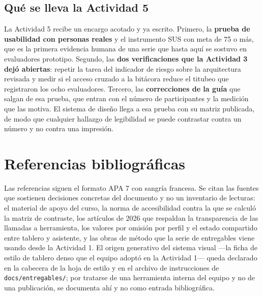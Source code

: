 \subsection{Qué se lleva la Actividad 5}

La Actividad 5 recibe un encargo acotado y ya escrito. Primero, la \textbf{prueba de usabilidad con personas reales} y el instrumento SUS con meta de 75 o más, que es la primera evidencia humana de una serie que hasta aquí se sostuvo en evaluadores prototipo. Segundo, las \textbf{dos verificaciones que la Actividad 3 dejó abiertas}: repetir la tarea del indicador de riesgo sobre la arquitectura revisada y medir si el acceso cruzado a la bitácora reduce el titubeo que registraron los ocho evaluadores. Tercero, las \textbf{correcciones de la guía} que salgan de esa prueba, que entran con el número de participantes y la medición que las motiva. El sistema de diseño llega a esa prueba con su matriz publicada, de modo que cualquier hallazgo de legibilidad se puede contrastar contra un número y no contra una impresión.

\section{Referencias bibliográficas}

Las referencias siguen el formato APA 7 con sangría francesa. Se citan las fuentes que sostienen decisiones concretas del documento y no un inventario de lecturas: el material de apoyo del curso, la norma de accesibilidad contra la que se calculó la matriz de contraste, los artículos de 2026 que respaldan la transparencia de las llamadas a herramienta, los valores por omisión por perfil y el estado compartido entre tablero y asistente, y las obras de método que la serie de entregables viene usando desde la Actividad 1. El origen generativo del sistema visual ---la ficha de estilo de tablero denso que el equipo adoptó en la Actividad 1--- queda declarado en la cabecera de la hoja de estilo y en el archivo de instrucciones de \texttt{docs/entregables/}; por tratarse de una herramienta interna del equipo y no de una publicación, se documenta ahí y no como entrada bibliográfica.

